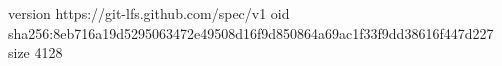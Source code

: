 version https://git-lfs.github.com/spec/v1
oid sha256:8eb716a19d5295063472e49508d16f9d850864a69ac1f33f9dd38616f447d227
size 4128
